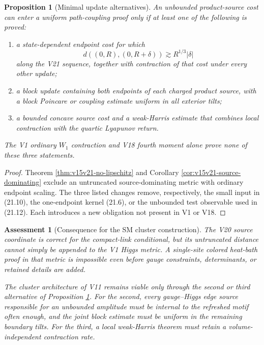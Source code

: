 \documentclass[11pt]{article}
\newtheorem{proposition}[theorem]{Proposition}
\newtheorem{assessment}[theorem]{Assessment}
\theoremstyle{remark}
\begin{document}
\begin{proposition}[Minimal update alternatives]
\label{prop:v15v21-alternatives}
An unbounded product-source cost can enter a uniform path-coupling
proof only if at least one of the following is proved:
\begin{enumerate}
\item a state-dependent endpoint cost for which
      \[
       d((0,R),(0,R+\delta))
       \gtrsim R^{1/3}|\delta|                              \tag{21.19}
      \]
      along the V21 sequence, together with contraction of that
      cost under every other update;
\item a block update containing both endpoints of each charged
      product source, with a block Poincare or coupling estimate
      uniform in all exterior tilts;
\item a bounded concave source cost and a weak-Harris estimate that
      combines local contraction with the quartic Lyapunov return.
\end{enumerate}
The V1 ordinary \(W_1\) contraction and V18 fourth moment alone
prove none of these three statements.
\end{proposition}

\begin{proof}
Theorem \ref{thm:v15v21-no-lipschitz} and Corollary
\ref{cor:v15v21-source-dominating} exclude an untruncated
source-dominating metric with ordinary endpoint scaling.  The three
listed changes remove, respectively, the small input in (21.10),
the one-endpoint kernel (21.6), or the unbounded test observable
used in (21.12).  Each introduces a new obligation not present in
V1 or V18.
\end{proof}

\begin{assessment}[Consequence for the SM cluster construction]
\label{ass:v15v21-sm}
The V20 source coordinate is correct for the compact-link
conditional, but its untruncated distance cannot simply be appended
to the V1 Higgs metric.  A single-site colored heat-bath proof in
that metric is impossible even before gauge constraints,
determinants, or retained details are added.

The cluster architecture of V11 remains viable only through the
second or third alternative of Proposition
\ref{prop:v15v21-alternatives}.  For the second, every
gauge--Higgs edge source responsible for an unbounded amplitude must
be internal to the refreshed motif often enough, and the joint
block estimate must be uniform in the remaining boundary tilts.
For the third, a local weak-Harris theorem must retain a
volume-independent contraction rate.
\end{assessment}
\end{document}
